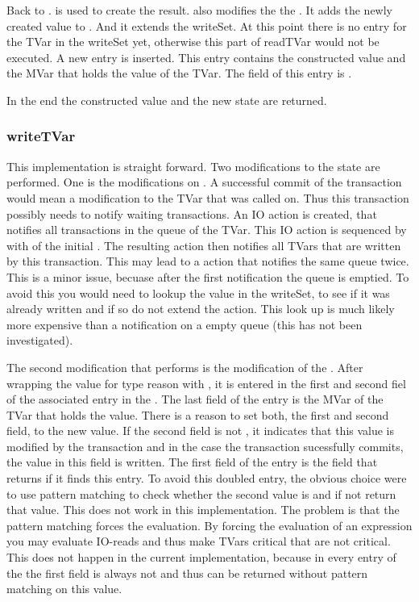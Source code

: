 Back to .  is used to create the result.  also modifies the 
the . It adds the newly created value to . And it extends the writeSet.
At this point there is no entry for the TVar in the writeSet yet, otherwise this part of readTVar
would not be executed. A new entry is inserted. This entry contains the constructed value and 
the MVar that holds the value of the TVar. The  field of this entry is .

In the end the constructed value and the new state are returned.

\subsubsection{writeTVar}
This implementation is straight forward. Two modifications to the state are performed. One is
the modifications on . A successful commit of the transaction would mean a 
modification to the TVar that  was called on. Thus this transaction 
possibly needs to notify waiting transactions. An IO action is created, that notifies
all transactions in the queue of the TVar. This IO action is sequenced by \code{>>} with 
 of the initial . The resulting action then notifies all
TVars that are written by this transaction. This may lead to a action that notifies the 
same queue twice. This is a minor issue, becuase after the first notification the queue 
is emptied. To avoid this you would need to lookup the value in the writeSet, to see if 
it was already written and if so do not extend the  action. This look up
is much likely more expensive than a notification on a empty queue (this has not been 
investigated). 

The second modification that  performs is the modification of the .
After wrapping the value for type reason with , it is entered in the first and second 
fiel of the associated entry in the . The last field of the entry is the MVar of
the TVar that holds the value. There is a reason to set both, the first and second field, to the
new value. If the second field is not , it indicates that this value is modified 
by the transaction and in the case the transaction sucessfully commits, the value in this field
is written. The first field of the entry is the field that  returns if it finds
this entry. To avoid this doubled entry, the obvious choice were to use pattern matching to 
check whether the second value is  and if not return that value. This does not
work in this implementation. The problem is that the pattern matching forces the evaluation.
By forcing the evaluation of an expression you may evaluate IO-reads and thus make TVars critical
that are not critical. This does not happen in the current implementation, because in every entry
of the  the first field is always not  and thus can be returned
without pattern matching on this value. 


